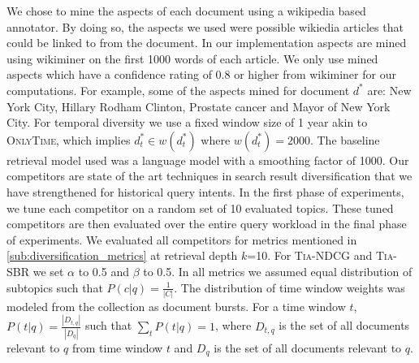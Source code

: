 We chose to mine the aspects of each document using a wikipedia based annotator. By doing so, the aspects we used were possible wikiedia articles that could be linked to from the document. In our implementation aspects are mined using wikiminer\cite{wikiminer} on the first 1000 words of each article. We only use mined aspects which have a confidence rating of 0.8 or higher from wikiminer for our computations. For example, some of the aspects mined for document $d^*$ are: New York City, Hillary Rodham Clinton, Prostate cancer and Mayor of New York City. For temporal diversity we use a fixed window size of 1 year akin to \textsc{OnlyTime}, which implies $d^*_t \in w(d^*_t)$ where $w(d^*_t)=2000$. The baseline retrieval model used was a language model with a smoothing factor of 1000. Our competitors are state of the art techniques in search result diversification that we have strengthened for historical query intents. In the first phase of experiments,  we tune each competitor on a random set of 10 evaluated topics. These tuned competitors are then evaluated over the entire query workload in the final phase of experiments. We evaluated all competitors for metrics mentioned in \ref{sub:diversification_metrics} at retrieval depth $k$=10. For \textsc{Tia-NDCG} and \textsc{Tia-SBR} we set $\alpha$ to 0.5 and $\beta$ to 0.5. In all metrics we assumed equal distribution of subtopics such that $P(c|q) = \frac{1}{|C|}$. The distribution of time window weights was modeled from the collection as document bursts. For a time window $t$, $P(t|q) = \frac{|D_{t,q}|}{|D_q|}$ such that $\sum_{t} P(t|q) = 1$, where $D_{t,q}$ is the set of all documents relevant to $q$ from time window $t$ and $D_q$ is the set of all documents relevant to $q$.




